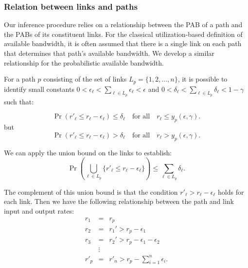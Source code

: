 \documentclass[final,5p,times,twocolumn]{elsarticle}
\begin{document}
\subsubsection{Relation between links and paths}
\label{sssec:path_link_relation}

Our inference procedure relies on a relationship between the PAB of a path and the PABs of its constituent links.  For the classical utilization-based definition of available bandwidth, it is often assumed that there is a single link on each path that determines that path's available bandwidth.  We develop a similar relationship for the probabilistic available bandwidth.




For a path $p$ consisting of the set of links $L_p = \{1,2,\dots,n\}$, it is possible to identify small constants $0<\epsilon_{\ell} < \textstyle{\sum}_{{\ell} \in L_p} \epsilon_{\ell} < \epsilon$ and $0<\delta_{\ell} < \textstyle{\sum}_{{\ell} \in L_p} \delta_{\ell} < 1 -\gamma$ such that:

\begin{equation}
\Pr(r'_{\ell} \leq r_{\ell} - \epsilon_{\ell}) \leq \delta_{\ell} \quad {\mathrm{ for\,\, all }} \quad r_\ell \leq y_p(\epsilon,\gamma). \label{eq:linkcond}
\end{equation} 
but 
\begin{equation}
\Pr(r'_{\ell} \leq r_{\ell} - \epsilon_{\ell}) > \delta_{\ell} \quad {\mathrm{ for\,\, all }} \quad r_\ell > y_p(\epsilon,\gamma). \label{eq:linkcond2}
\end{equation} 

We can apply the union bound on the links to establish:
\begin{equation}
\Pr\left(\bigcup_{{\ell} \in L_p} \{r'_{\ell} \le r_{\ell} - \epsilon_{\ell}\}\right) \le \sum_{{\ell} \in L_p} \delta_{\ell}. \label{eq:unionbound}
\end{equation} 

The complement of this union bound is that the condition $r'_{\ell}>r_{\ell}-\epsilon_\ell$ holds for each link. Then we have the following relationship between the path and link input and output rates:
\begin{eqnarray*}
r_1 &=& r_p\\
r_2 &=& r_1' > r_p - \epsilon_1 \\
r_3 &=& r_2' > r_p - \epsilon_1 - \epsilon_2 \\
&\vdots& \\
r'_p &=& r'_n > r_p - \sum_{i=1}^n \epsilon_i.
\end{eqnarray*}
\end{document}
